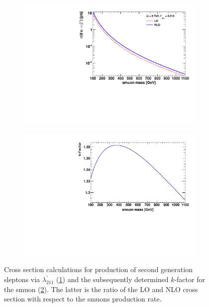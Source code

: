 \begin{figure}[!htb]
  \centering
  \begin{subfigure}[b]{0.495\textwidth}
    \centering
    \includegraphics[width=\textwidth]{plots/xs.pdf}
    \caption{\label{fig:xs}}
  \end{subfigure}
  \begin{subfigure}[b]{0.495\textwidth}
    \centering
    \includegraphics[width=\textwidth]{plots/k_smuon.pdf}
    \caption{\label{fig:k-smuon}}
  \end{subfigure}
  \caption{Cross section calculations for production of second generation sleptons via $\lambda^\prime_{211}$ (\ref{fig:xs}) and the subsequently determined $k$-factor for the smuon (\ref{fig:k-smuon}). The latter is the ratio of the LO and NLO cross section with respect to the smuons production rate.}
  \label{fig:susys-xs-kfactor}
\end{figure}

